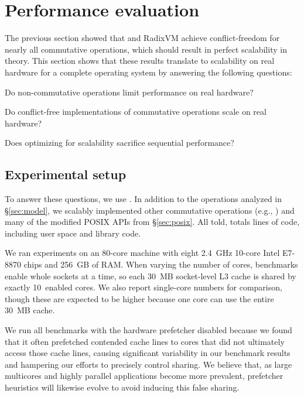 \section{Performance evaluation}
\label{sec:eval}

The previous section showed that \fs and RadixVM achieve conflict-freedom
for nearly all commutative operations, which should result
in perfect scalability in
theory.  This section shows that these results translate to scalability on
real hardware for a complete operating system by answering the following
questions:

\begin{CompactItemize}

\item Do non-commutative operations limit performance on real
  hardware?

\item Do conflict-free implementations of commutative operations scale
  on real hardware?

\item Does optimizing for scalability sacrifice sequential performance?

\end{CompactItemize}


\subsection{Experimental setup}
\label{sec:topic:ben}

To answer these questions, we use \sys.
In addition to the operations analyzed in \S\ref{sec:model}, we scalably
implemented
other commutative operations (e.g., )
and many of the modified POSIX APIs from
\S\ref{sec:posix}.
%
All told, \sys
totals  lines of code, including user
space and library code.

We ran experiments on an 80-core machine with eight 2.4~GHz 10-core
Intel E7-8870 chips and 256~GB of RAM.  When varying the number of
cores, benchmarks enable whole sockets at a time, so each 30~MB
socket-level L3 cache is shared by exactly 10~enabled cores.
We also report single-core numbers for
comparison, though these are expected to be higher because one
core can use the entire 30~MB cache.

We run all benchmarks with the hardware prefetcher disabled because we
found that it often prefetched contended cache lines to cores that did
not ultimately access those cache lines, causing significant
variability in our benchmark results and hampering our efforts to
precisely control sharing.  We believe that, as large multicores and
highly parallel applications become more prevalent, prefetcher
heuristics will likewise evolve to avoid inducing this false sharing.


